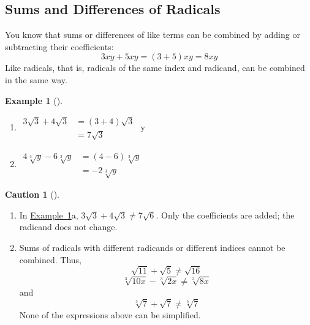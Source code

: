 \documentclass[10pt,]{book}
\theoremstyle{plain}
\theoremstyle{definition}
\newtheorem{warning}[theorem]{Caution}
\theoremstyle{definition}
\newtheorem{example}[theorem]{Example}
\theoremstyle{definition}
\numberwithin{equation}{part}
\newcommand{\amp}{&}
\begin{document}
\subsection[{Sums and Differences of Radicals}]{Sums and Differences of Radicals}\label{subsection-45}
You know that sums or differences of like terms can be combined by adding or subtracting their coefficients:%
\begin{equation*}
3xy + 5xy = (3 + 5)xy = 8xy
\end{equation*}
Like radicals, that is, radicals of the same index and radicand, can be combined in the same way.%
\begin{example}[]\label{example-like-radicals}
\leavevmode%
\begin{enumerate}[label=*\alph**]
\item\hypertarget{li-346}{}\(\begin{aligned}
3\sqrt{3}+4\sqrt{3} \amp = (3+4)\sqrt{3}\\
\amp = 7\sqrt{3}
\end{aligned}\)%
y \item\hypertarget{li-347}{}\(\begin{aligned}
4\sqrt[3]{y}-6\sqrt[3]{y} \amp = (4-6)\sqrt[3]{y}\\
\amp = -2\sqrt[3]{y}
\end{aligned}\)%
\end{enumerate}
%
\end{example}
\begin{warning}[]\label{warning-15}
\leavevmode%
\begin{enumerate}[label=*\arabic**]
\item\hypertarget{li-348}{}In \hyperref[example-like-radicals]{Example~\ref{example-like-radicals}}a, \(3\sqrt{3}+4\sqrt{3}\ne 7\sqrt{6} \). Only the coefficients are added; the radicand does not change.%
\item\hypertarget{li-349}{}Sums of radicals with different radicands or different indices cannot be combined. Thus,%
\begin{equation*}
\sqrt{11}+\sqrt{5}\ne\sqrt{16} 
\end{equation*}
%
\begin{equation*}
\sqrt[3]{10x}-\sqrt[3]{2x}\ne\sqrt[3]{8x} 
\end{equation*}
and%
\begin{equation*}
\sqrt[3]{7}+\sqrt{7}\ne\sqrt[5]{7} 
\end{equation*}
None of the expressions above can be simplified.%
\end{enumerate}
%
\end{warning}
\typeout{************************************************}
\typeout{************************************************}
\end{document}

